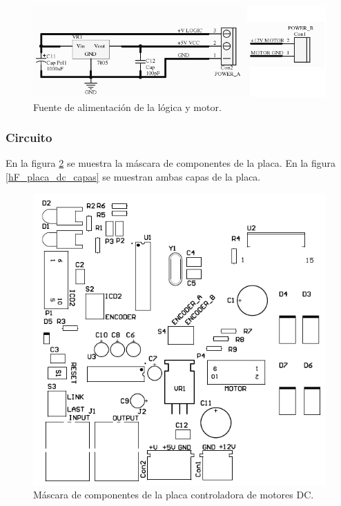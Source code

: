 \begin{figure}
	\centering
	\includegraphics[scale=.3]{figuras/dc_schemaFuente.png}
	\caption{Fuente de alimentaci\'on de la l\'ogica y motor.}
	\label{hF_placa_dc_schema5}
\end{figure}

\subsubsection{Circuito}
\label{h_placas_motorDC_circuito}

En la figura \ref{hF_placa_dc_componentes} se muestra la m\'ascara de componentes de la placa.
En la figura \ref{hF_placa_dc_capas} se muestran ambas capas de la placa.

\begin{figure}
	\centering
	\includegraphics[scale=.3]{figuras/dc_componentes.png}
	\caption{M\'ascara de componentes de la placa controladora de motores DC.}
	\label{hF_placa_dc_componentes}
\end{figure}

